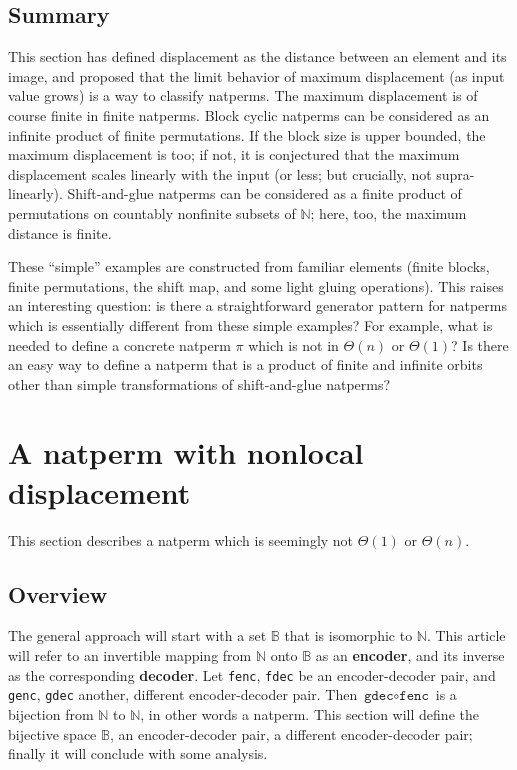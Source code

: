 \documentclass[12pt,reqno]{article}
\begin{document}
\subsection{Summary}

This section has defined displacement as the distance between an element and its image, and proposed that the limit behavior of maximum displacement (as input value grows) is a way to classify natperms. The maximum displacement is of course finite in finite natperms. Block cyclic natperms can be considered as an infinite product of finite permutations. If the block size is upper bounded, the maximum displacement is too; if not, it is conjectured that the maximum displacement scales linearly with the input (or less; but crucially, not supra-linearly). Shift-and-glue natperms can be considered as a finite product of permutations on countably nonfinite subsets of $\mathbb{N}$; here, too, the maximum distance is finite.

These ``simple'' examples are constructed from familiar elements (finite blocks, finite permutations, the shift map, and some light gluing operations). This raises an interesting question: is there a straightforward generator pattern for natperms which is essentially different from these simple examples? For example, what is needed to define a concrete natperm $\pi$ which is not in $\Theta(n)$ or $\Theta(1)$? Is there an easy way to define a natperm that is a product of finite and infinite orbits other than simple transformations of shift-and-glue natperms?

\section{A natperm with nonlocal displacement}

This section describes a natperm which is seemingly not $\Theta(1)$ or $\Theta(n)$.

\subsection{Overview}

The general approach will start with a set $\mathbb{B}$ that is isomorphic to $\mathbb{N}$. This article will refer to an invertible mapping from $\mathbb{N}$ onto $\mathbb{B}$ as an \textbf{encoder}, and its inverse as the corresponding \textbf{decoder}. Let \texttt{fenc}, \texttt{fdec} be an encoder-decoder pair, and \texttt{genc}, \texttt{gdec} another, different encoder-decoder pair. Then $\texttt{gdec} \circ \texttt{fenc}$ is a bijection from $\mathbb{N}$ to $\mathbb{N}$, in other words a natperm. This section will define the bijective space $\mathbb{B}$, an encoder-decoder pair, a different encoder-decoder pair; finally it will conclude with some analysis.
\end{document}
